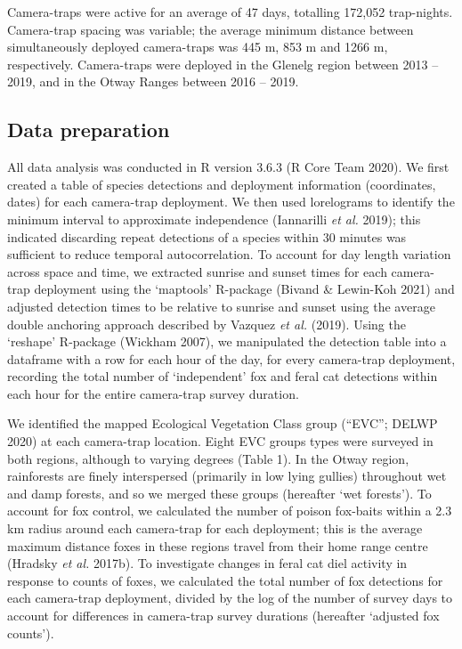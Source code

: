 \documentclass[11pt,a4paper,titlepage,twoside,openright]{style/unimelbthesis}
\begin{document}
\begin{mainmatter}
Camera-traps were active for an average of 47 days, totalling 172,052 trap-nights. Camera-trap spacing was variable; the average minimum distance between simultaneously deployed camera-traps was 445 m, 853 m and 1266 m, respectively. Camera-traps were deployed in the Glenelg region between 2013 -- 2019, and in the Otway Ranges between 2016 -- 2019.

\hypertarget{data-preparation}{%
\subsection{Data preparation}\label{data-preparation}}

All data analysis was conducted in R version 3.6.3 (R Core Team 2020). We first created a table of species detections and deployment information (coordinates, dates) for each camera-trap deployment. We then used lorelograms to identify the minimum interval to approximate independence (Iannarilli \emph{et al.} 2019); this indicated discarding repeat detections of a species within 30 minutes was sufficient to reduce temporal autocorrelation. To account for day length variation across space and time, we extracted sunrise and sunset times for each camera-trap deployment using the `maptools' R-package (Bivand \& Lewin-Koh 2021) and adjusted detection times to be relative to sunrise and sunset using the average double anchoring approach described by Vazquez \emph{et al.} (2019). Using the `reshape' R-package (Wickham 2007), we manipulated the detection table into a dataframe with a row for each hour of the day, for every camera-trap deployment, recording the total number of `independent' fox and feral cat detections within each hour for the entire camera-trap survey duration.

We identified the mapped Ecological Vegetation Class group (``EVC''; DELWP 2020) at each camera-trap location. Eight EVC groups types were surveyed in both regions, although to varying degrees (Table 1). In the Otway region, rainforests are finely interspersed (primarily in low lying gullies) throughout wet and damp forests, and so we merged these groups (hereafter `wet forests'). To account for fox control, we calculated the number of poison fox-baits within a 2.3 km radius around each camera-trap for each deployment; this is the average maximum distance foxes in these regions travel from their home range centre (Hradsky \emph{et al.} 2017b). To investigate changes in feral cat diel activity in response to counts of foxes, we calculated the total number of fox detections for each camera-trap deployment, divided by the log of the number of survey days to account for differences in camera-trap survey durations (hereafter `adjusted fox counts').


\end{mainmatter}
\end{document}
